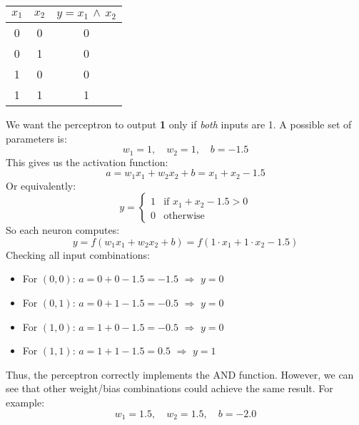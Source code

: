 \begin{examplebox}
    \begin{center}
        \begin{tabular}{@{} c c c @{}}
            \toprule
            $x_{1}$ & $x_{2}$ & $y = x_{1} \, \land \, x_{2}$ \\
            \midrule
            0 & 0 & 0 \\
            0 & 1 & 0 \\
            1 & 0 & 0 \\
            1 & 1 & 1 \\
            \bottomrule
        \end{tabular}
    \end{center}

    We want the perceptron to output \textbf{1} only if \emph{both} inputs are 1. A possible set of parameters is:
    \begin{equation*}
        w_{1} = 1, \quad w_{2} = 1, \quad b = -1.5
    \end{equation*}
    This gives us the activation function:
    \begin{equation*}
        a = w_{1} x_{1} + w_{2} x_{2} + b = x_{1} + x_{2} - 1.5
    \end{equation*}
    Or equivalently:
    \begin{equation*}
        y =
        \begin{cases}
            1 & \text{if } x_{1} + x_{2} - 1.5 > 0 \\
            0 & \text{otherwise}
        \end{cases}
    \end{equation*}
    So each neuron computes:
    \begin{equation*}
        y = f\left(
            w_{1} x_{1} + w_{2} x_{2} + b
        \right) = f\left(
            1 \cdot x_{1} + 1 \cdot x_{2} - 1.5
        \right)
    \end{equation*}
    Checking all input combinations:
    \begin{itemize}
        \item For $(0, 0)$: $a = 0 + 0 - 1.5 = -1.5$ $\Rightarrow$ $y = 0$
        \item For $(0, 1)$: $a = 0 + 1 - 1.5 = -0.5$ $\Rightarrow$ $y = 0$
        \item For $(1, 0)$: $a = 1 + 0 - 1.5 = -0.5$ $\Rightarrow$ $y = 0$
        \item For $(1, 1)$: $a = 1 + 1 - 1.5 = 0.5$ $\Rightarrow$ $y = 1$
    \end{itemize}
    Thus, the perceptron correctly implements the AND function. However, we can see that other weight/bias combinations could achieve the same result. For example:
    \begin{equation*}
        w_{1} = 1.5, \quad w_{2} = 1.5, \quad b = -2.0
    \end{equation*}
\end{examplebox}

